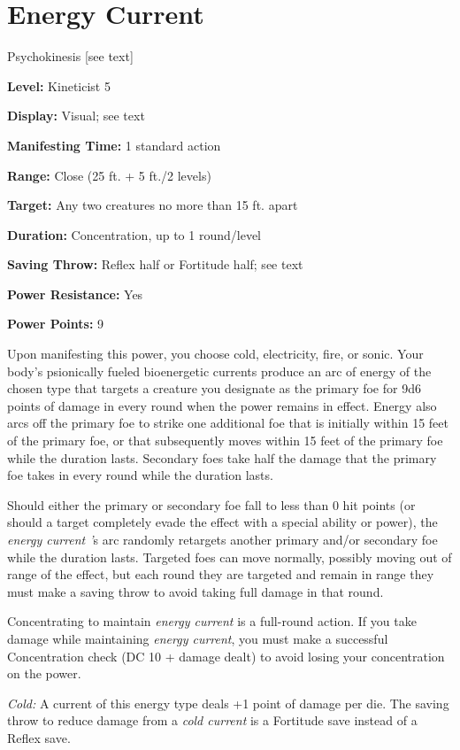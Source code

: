 \documentclass{article}
\begin{document}
\section*{Energy Current}

Psychokinesis [see text]

\textbf{Level:} Kineticist 5

\textbf{Display:} Visual; see text

\textbf{Manifesting Time:} 1 standard action

\textbf{Range:} Close (25 ft. + 5 ft./2 levels)

\textbf{Target:} Any two creatures no more than 15 ft. apart

\textbf{Duration:} Concentration, up to 1 round/level

\textbf{Saving Throw:} Reflex half or Fortitude half; see text

\textbf{Power Resistance:} Yes

\textbf{Power Points:} 9

Upon manifesting this power, you choose cold, electricity, fire, or sonic. Your 
body's psionically fueled bioenergetic currents produce an arc of energy of the 
chosen type that targets a creature you designate as the primary foe for 9d6 points 
of damage in every round when the power remains in effect. Energy also arcs off 
the primary foe to strike one additional foe that is initially within 15 feet of 
the primary foe, or that subsequently moves within 15 feet of the primary foe while 
the duration lasts. Secondary foes take half the damage that the primary foe takes 
in every round while the duration lasts.

Should either the primary or secondary foe fall to less than 0 hit points (or should 
a target completely evade the effect with a special ability or power), the \textit{energy 
current '}s arc randomly retargets another primary and/or secondary foe while the 
duration lasts. Targeted foes can move normally, possibly moving out of range of 
the effect, but each round they are targeted and remain in range they must make 
a saving throw to avoid taking full damage in that round.

Concentrating to maintain \textit{energy current }is a full-round action. If you 
take damage while maintaining \textit{energy current}, you must make a successful 
Concentration check (DC 10 + damage dealt) to avoid losing your concentration on 
the power.

\textit{Cold: }A current of this energy type deals +1 point of damage per die. 
The saving throw to reduce damage from a \textit{cold current }is a Fortitude save 
instead of a Reflex save.
\end{document}
